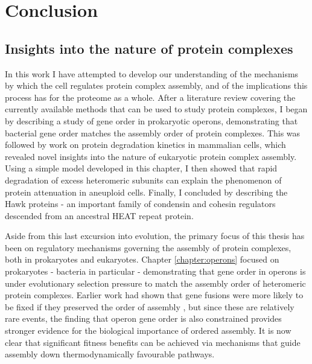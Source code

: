 \documentclass[a4paper,11pt,twoside,openright]{scrbook}
\begin{document}
\chapter{Conclusion}\label{chapter:conclusion}
\section{Insights into the nature of protein complexes}
In this work I have attempted to develop our understanding of the mechanisms by which the cell regulates protein complex assembly, and of the implications this process has for the proteome as a whole. After a literature review covering the currently available methods that can be used to study protein complexes, I began by describing a study of gene order in prokaryotic operons, demonstrating that bacterial gene order matches the assembly order of protein complexes. This was followed by work on protein degradation kinetics in mammalian cells, which revealed novel insights into the nature of eukaryotic protein complex assembly. Using a simple model developed in this chapter, I then showed that rapid degradation of excess heteromeric subunits can explain the phenomenon of protein attenuation in aneuploid cells. Finally, I concluded by describing the Hawk proteins - an important family of condensin and cohesin regulators descended from an ancestral HEAT repeat protein.
%

Aside from this last excursion into evolution, the primary focus of this thesis has been on regulatory mechanisms governing the assembly of protein complexes, both in prokaryotes and eukaryotes. Chapter \ref{chapter:operons} focused on prokaryotes - bacteria in particular - demonstrating that gene order in operons is under evolutionary selection pressure to match the assembly order of heteromeric protein complexes. Earlier work had shown that gene fusions were more likely to be fixed if they preserved the order of assembly \cite{Marsh2013}, but since these are relatively rare events, the finding that operon gene order is also constrained provides stronger evidence for the biological importance of ordered assembly. It is now clear that significant fitness benefits can be achieved via mechanisms that guide assembly down thermodynamically favourable pathways.
\end{document}
